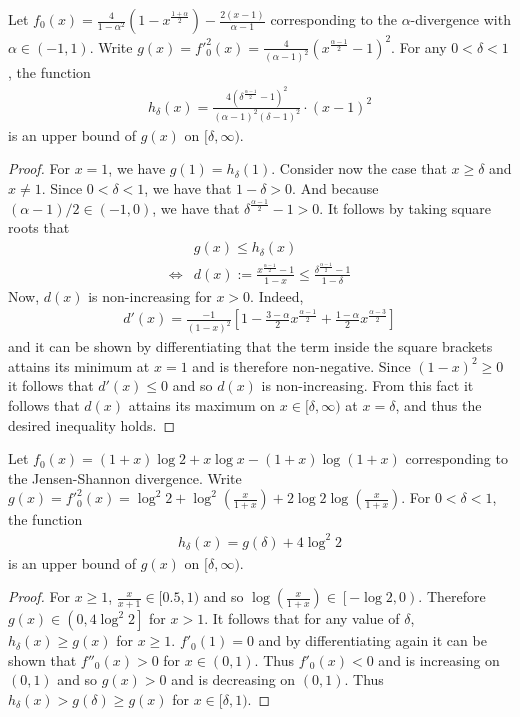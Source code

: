\begin{lemma}\label{lemma:upper-bound-alpha}
Let $f_0(x) = \frac{4}{1-\alpha^2}\left(1 -x^{\frac{1+\alpha}{2}}\right) - \frac{2(x-1)}{\alpha-1}$ corresponding to the $\alpha$-divergence with $\alpha \in (-1,1)$. 
Write $g(x) = f'^2_0(x) = \frac{4}{(\alpha -1)^2} \left(x^\frac{\alpha-1}{2} - 1\right)^2$.
For any $0<\delta<1$, the function
\begin{align*}
    h_\delta(x) = \frac{4\left(\delta^\frac{\alpha-1}{2} - 1\right)^2}{(\alpha - 1)^2 (\delta- 1)^2}\cdot (x-1)^2
\end{align*}
is an upper bound of $g(x)$ on $[\delta, \infty)$.
\end{lemma}
\begin{proof}
For $x=1$, we have $g(1)=h_\delta(1)$. 
Consider now the case that $x\geq\delta$ and $x\not=1$. 
Since $0<\delta <1$, we have that $1-\delta > 0$.
And because $(\alpha-1)/2 \in (-1,0)$, we have that $\delta^{\frac{\alpha - 1}{2}} - 1 > 0$.
It follows by taking square roots that
\begin{align*}
    &g(x) \leq h_\delta(x) \\
    \iff& d(x) := \frac{x^{\frac{\alpha -1}{2}} -1}{1-x} \leq \frac{\delta^{\frac{\alpha -1}{2}} -1}{1-\delta} 
\end{align*}
Now, $d(x)$ is non-increasing for $x>0$. Indeed,
\begin{align*}
    d'(x) = \frac{-1}{(1-x)^2} \left[ 1 - \frac{3 - \alpha}{2}x^{\frac{\alpha -1}{2}} + \frac{1-\alpha}{2} x^{\frac{\alpha-3}{2}} \right]
\end{align*}
and it can be shown by differentiating that the term inside the square brackets attains its minimum at $x=1$ and is therefore non-negative. Since $(1-x)^2 \geq 0$ it follows that $d'(x) \leq 0$ and so $d(x)$ is non-increasing.
From this fact it follows that $d(x)$ attains its maximum on $x \in [\delta, \infty)$ at $x=\delta$, and thus the desired inequality holds. 
\end{proof}

\begin{lemma}\label{lemma:upper-bound-JS}
Let $f_0(x) = \left(1+x\right) \log 2 + x\log x - \left( 1 + x\right) \log \left(1+x\right)$ corresponding to the Jensen-Shannon divergence.
Write $g(x) = f'^2_0(x) = \log^2 2 + \log^2\left( \frac{x}{1+x} \right) + 2\log 2 \log\left( \frac{x}{1+x} \right)$.
For $0< \delta < 1$, the function
\begin{align*}
    h_\delta(x) = g(\delta) + 4\log^2 2
\end{align*}
is an upper bound of $g(x)$ on $[\delta, \infty)$.
\end{lemma}
\begin{proof}
For $x\geq1$,  $\frac{x}{x+1} \in [0.5, 1)$ and so $\log\left( \frac{x}{1+x} \right) \in \left[-\log2, 0\right)$.
Therefore $g(x) \in \left(0, 4\log^2 2\right]$ for $x>1$.
It follows that for any value of $\delta$, $h_\delta(x) \geq g(x)$ for $x\geq1$.
$f'_0(1)=0$ and by differentiating again it can be shown that $f''_0(x) > 0$ for $x\in(0,1)$.
Thus $f'_0(x)<0$ and is increasing on $(0,1)$ and so $g(x) > 0$ and is decreasing on $(0,1)$.
Thus $h_\delta(x) > g(\delta) \geq g(x)$ for $x \in [\delta, 1)$.
\end{proof}

